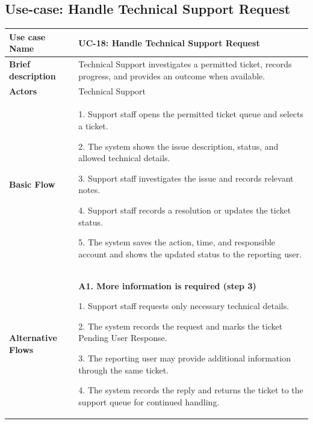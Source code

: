 \subsection{Use-case: Handle Technical Support Request}
\label{uc:uc-18}
\begin{longtable}{|p{}|p{}|}
\hline
\textbf{Use case Name} & UC-18: Handle Technical Support Request \\ \hline
\textbf{Brief description} & Technical Support investigates a permitted ticket, records progress, and provides an outcome when available. \\ \hline
\textbf{Actors} & Technical Support \\ \hline
\textbf{Basic Flow} &
1. Support staff opens the permitted ticket queue and selects a ticket.\par
2. The system shows the issue description, status, and allowed technical details.\par
3. Support staff investigates the issue and records relevant notes.\par
4. Support staff records a resolution or updates the ticket status.\par
5. The system saves the action, time, and responsible account and shows the updated status to the reporting user.
\\ \hline
\textbf{Alternative Flows} &

\textbf{A1. More information is required (step 3)}\par
1. Support staff requests only necessary
technical details.\par
2. The system records the request and marks
the ticket Pending User Response.\par
3. The reporting user may provide additional
information through the same ticket.\par
4. The system records the reply and returns
the ticket to the support queue for continued handling.


\end{longtable}
